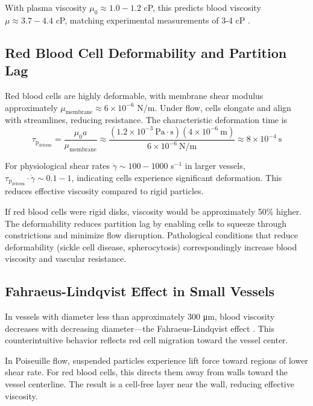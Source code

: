 \documentclass[12pt,a4paper]{article}
\theoremstyle{remark}
\newcommand{\taulag}{\tau_{\mathrm{p}}}
\begin{document}
With plasma viscosity $\mu_{0} \approx 1.0-1.2$ cP, this predicts blood viscosity $\mu \approx 3.7-4.4$ cP, matching experimental measurements of 3-4 cP \cite{chien1970blood}.

\subsection{Red Blood Cell Deformability and Partition Lag}

Red blood cells are highly deformable, with membrane shear modulus approximately $\mu_{\mathrm{membrane}} \approx 6 \times 10^{-6}$ N/m. Under flow, cells elongate and align with streamlines, reducing resistance. The characteristic deformation time is
\begin{equation}
\taulag_{\mathrm{deform}} = \frac{\mu_{0} a}{\mu_{\mathrm{membrane}}} \approx \frac{(1.2 \times 10^{-3}~\mathrm{Pa \cdot s})(4 \times 10^{-6}~\mathrm{m})}{6 \times 10^{-6}~\mathrm{N/m}} \approx 8 \times 10^{-4}~\mathrm{s}
\end{equation}

For physiological shear rates $\dot{\gamma} \sim 100-1000$ s$^{-1}$ in larger vessels, $\taulag_{\mathrm{deform}} \cdot \dot{\gamma} \sim 0.1-1$, indicating cells experience significant deformation. This reduces effective viscosity compared to rigid particles.

If red blood cells were rigid disks, viscosity would be approximately 50\% higher. The deformability reduces partition lag by enabling cells to squeeze through constrictions and minimize flow disruption. Pathological conditions that reduce deformability (sickle cell disease, spherocytosis) correspondingly increase blood viscosity and vascular resistance.

\subsection{Fahraeus-Lindqvist Effect in Small Vessels}

In vessels with diameter less than approximately 300 μm, blood viscosity decreases with decreasing diameter—the Fahraeus-Lindqvist effect \cite{fahraeus1931viscosity}. This counterintuitive behavior reflects red cell migration toward the vessel center.

In Poiseuille flow, suspended particles experience lift force toward regions of lower shear rate. For red blood cells, this directs them away from walls toward the vessel centerline. The result is a cell-free layer near the wall, reducing effective viscosity.
\end{document}
